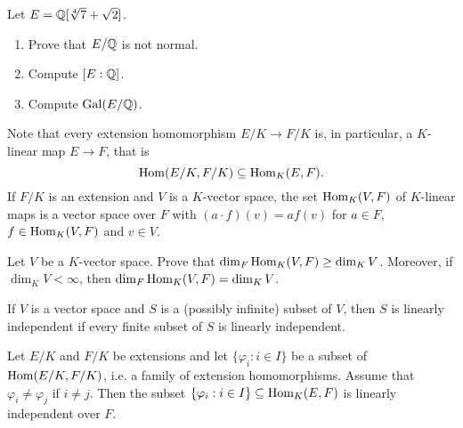 \begin{exercise}
    Let $E=\mathbb{Q}[\sqrt[4]{7}+\sqrt{2}]$. 
    \begin{enumerate}
        \item Prove that $E/\mathbb{Q}$ is not normal. 
        \item Compute $[E:\mathbb{Q}]$.
        \item Compute $\operatorname{Gal}(E/\mathbb{Q})$. 
    \end{enumerate}
\end{exercise}



Note that every extension homomorphism $E/K\to F/K$ is, in particular, 
a $K$-linear map $E\to F$, that is
\[
\operatorname{Hom}(E/K,F/K)\subseteq\operatorname{Hom}_K(E,F).
\]
If $F/K$ is an extension and $V$ 
is a $K$-vector space, the set
$\operatorname{Hom}_K(V,F)$ of $K$-linear maps
is a vector space over $F$ with
$(a\cdot f)(v)=af(v)$ for $a\in F$, 
$f\in\operatorname{Hom}_K(V,F)$ and $v\in V$. 

\begin{exercise}
\label{xca:dim}
    Let $V$ be a $K$-vector space. 
    Prove that $\dim_F\operatorname{Hom}_K(V,F)\geq\dim_KV$. Moreover, if 
     $\dim_KV<\infty$, then $\dim_F\operatorname{Hom}_K(V,F)=\dim_KV$.
\end{exercise}

If $V$ is a vector space and $S$ is a (possibly infinite) subset of $V$, 
then $S$ is linearly independent if every finite subset of $S$ is linearly independent. 

\begin{theorem}[Dedekind]
Let $E/K$ and $F/K$ be extensions and let 
$\{\varphi_i:i\in I\}$ 
be a subset of
$\operatorname{Hom}(E/K,F/K)$, i.e. a 
family of extension homomorphisms. Assume that 
$\varphi_i\ne \varphi_j$ if $i\ne j$. Then 
the subset $\{\varphi_i:i\in I\}\subseteq\operatorname{Hom}_K(E,F)$ 
is linearly independent over $F$. 
\end{theorem}

